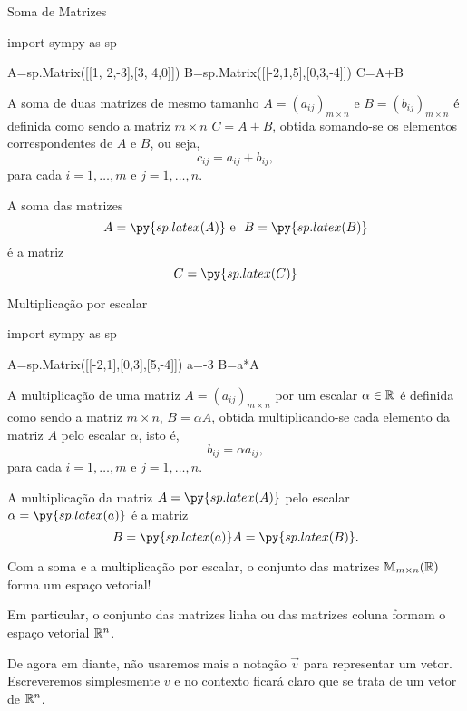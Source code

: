 \begin{frame}[label=matrizes,fragile=singleslide]{Soma de Matrizes}
\begin{pycode}
import sympy as sp

A=sp.Matrix([[1, 2,-3],[3, 4,0]])
B=sp.Matrix([[-2,1,5],[0,3,-4]])
C=A+B
\end{pycode}

A {\color{blue} soma} de duas matrizes de {\color{blue} mesmo tamanho} $A=(a_{ij})_{m\times n}$ e $B=(b_{ij})_{m\times n}$ é definida como sendo a matriz $m\times n$ $C=A+B$, obtida somando-se os elementos correspondentes de $A$ e $B$, ou seja, 
\[c_{ij}=a_{ij}+b_{ij},\]
para cada $i=1,\ldots,m$ e $j=1,\ldots,n$.

\begin{exe}
A soma das matrizes \[
A=\py{sp.latex(A)} \text{ e } \ 
B=\py{sp.latex(B)}
\]
é a matriz 
\[C=\py{sp.latex(C)}\]
\end{exe}
\end{frame}


\begin{frame}[label=matrizes,fragile=singleslide]{Multiplicação por escalar}
\begin{pycode}
import sympy as sp

A=sp.Matrix([[-2,1],[0,3],[5,-4]])
a=-3
B=a*A
\end{pycode}

A {\color{blue} multiplicação de uma matriz} $A=(a_{ij})_{m\times n}$  {\color{blue} por um escalar} $\alpha\in \mathbb{R}$ é definida como sendo a matriz $m\times n$, $B=\alpha A$, obtida multiplicando-se cada elemento da matriz $A$ pelo escalar $\alpha$, isto é,
\[b_{ij}=\alpha a_{ij},\]
para cada $i=1,\ldots,m$ e $j=1,\ldots,n$.



\end{frame}

\begin{frame}[label=matrizes]

\begin{exe}
A multiplicação  da matriz $A=\py{sp.latex(A)} $ pelo escalar $\alpha=\py{sp.latex(a)}$ é a matriz
\[B=\py{sp.latex(a)} A=\py{sp.latex(B)}.\]
\end{exe}

\begin{block}{}
Com a soma e a multiplicação por escalar, {\color{blue}o conjunto das matrizes $\mathbb{M}_{m\times n}(\mathbb{R})$ forma um espaço vetorial}!
\medskip

Em particular, o conjunto das  matrizes linha ou das matrizes coluna formam o espaço vetorial $\mathbb{R}^n$.
\medskip

De agora em diante, não usaremos mais a notação $\vec{v}$ para representar um vetor. Escreveremos simplesmente $v$ e no contexto ficará claro que se trata de um vetor de $\mathbb{R}^n$.
\end{block}

\end{frame}

